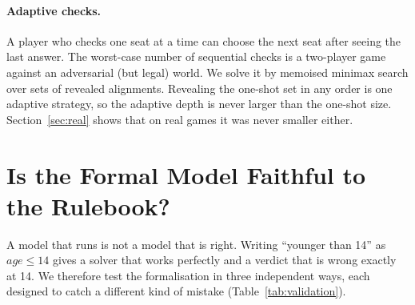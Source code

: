 \documentclass[runningheads]{llncs}
\begin{document}
\paragraph{Adaptive checks.}
A player who checks one seat at a time can choose the next seat after seeing the last answer. The worst-case number
of sequential checks is a two-player game against an adversarial (but legal) world. We solve it by memoised minimax
search over sets of revealed alignments. Revealing the one-shot set in any order is one adaptive strategy, so the
adaptive depth is never larger than the one-shot size. Section~\ref{sec:real} shows that on real games it was never
smaller either.

\section{Is the Formal Model Faithful to the Rulebook?}\label{sec:faithful}
A model that runs is not a model that is right. Writing ``younger than 14'' as $\mathit{age}\le14$ gives a solver
that works perfectly and a verdict that is wrong exactly at 14. We therefore test the formalisation in three
independent ways, each designed to catch a different kind of mistake (Table~\ref{tab:validation}).
\end{document}
